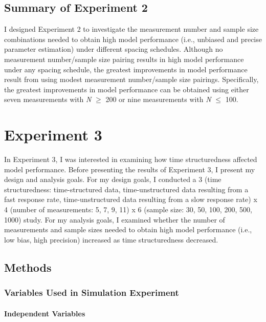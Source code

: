 \documentclass[
12pt, %
twoside,
english]{guelphthesis}
\begin{document}
\hypertarget{summary-of-experiment-2}{%
\section{Summary of Experiment 2}\label{summary-of-experiment-2}}

I designed Experiment 2 to investigate the measurement number and sample size combinations needed to obtain high model performance (i.e., unbiased and precise parameter estimation) under different spacing schedules. Although no measurement number/sample size pairing results in high model performance under any spacing schedule, the greatest improvements in model performance result from using modest measurement number/sample size pairings. Specifically, the greatest improvements in model performance can be obtained using either seven measurements with \emph{N} \(\ge\) 200 or nine measurements with \emph{N} \(\le\) 100.

\hypertarget{Exp3}{%
\chapter{Experiment 3}\label{Exp3}}

In Experiment 3, I was interested in examining how time structuredness affected model performance. Before presenting the results of Experiment 3, I present my design and analysis goals. For my design goals, I conducted a 3 (time structuredness: time-structured data, time-unstructured data resulting from a fast response rate, time-unstructured data resulting from a slow response rate) x 4 (number of measurements: 5, 7, 9, 11) x 6 (sample size: 30, 50, 100, 200, 500, 1000) study. For my analysis goals, I examined whether the number of measurements and sample sizes needed to obtain high model performance (i.e., low bias, high precision) increased as time structuredness decreased.

\hypertarget{methods-2}{%
\section{Methods}\label{methods-2}}

\hypertarget{variables-used-in-simulation-experiment-2}{%
\subsection{Variables Used in Simulation Experiment}\label{variables-used-in-simulation-experiment-2}}

\hypertarget{independent-variables-2}{%
\subsubsection{Independent Variables}\label{independent-variables-2}}
\end{document}

